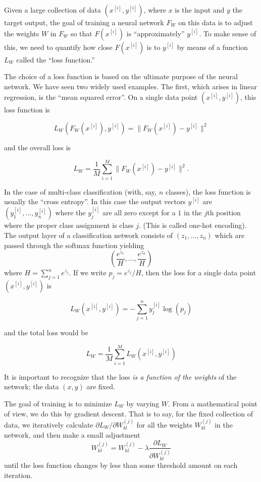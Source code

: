 \documentclass[
  11pt,
  letterpaper,
]{scrbook}
\theoremstyle{plain}
\theoremstyle{remark}
\begin{document}
Given a large collection of data \((x^{[i]},y^{[i]})\), where \(x\) is
the input and \(y\) the target output, the goal of training a neural
network \(F_{W}\) on this data is to adjust the weights \(W\) in
\(F_{W}\) so that \(F(x^{[i]})\) is ``approximately'' \(y^{[i]}\). To
make sense of this, we need to quantify how close \(F(x^{[i]})\) is to
\(y^{[i]}\) by means of a function \(L_{W}\) called the ``loss
function.''

The choice of a loss function is based on the ultimate purpose of the
neural network. We have seen two widely used examples. The first, which
arises in linear regression, is the ``mean squared error''. On a single
data point \((x^{[i]},y^{[i]})\), this loss function is

\[
L_{W}(F_{W}(x^{[i]}),y^{[i]}) =  \|F_{W}(x^{[i]})-y^{[i]}\|^2
\]

and the overall loss is

\[
L_{W}=\frac{1}{M}\sum_{i=1}^{M} \|F_{W}(x^{[i]})-y^{[i]}\|^2.
\]

In the case of multi-class classification (with, say, \(n\) classes),
the loss function is usually the ``cross entropy''. In this case the
output vectors \(y^{[i]}\) are \((y_{1}^{[i]},\ldots, y_{n}^{[i]})\)
where the \(y_j^{[i]}\) are all zero except for a \(1\) in the \(j\)th
position where the proper class assignment is class \(j\). (This is
called one-hot encoding). The output layer of a classification network
consists of \((z_{1},\ldots, z_{n})\) which are passed through the
softmax function yielding \[
(\frac{e^{z_1}}{H},\ldots, \frac{e^{z_{n}}}{H})
\] where \(H=\sum_{j=1}^{n} e^{z_{j}}.\) If we write
\(p_{j}=e^{z_{j}}/H\), then the loss for a single data point
\((x^{[i]},y^{[i]})\) is

\[
L_{W}(x^{[i]},y^{[i]}) = -\sum_{j=1}^{n} y^{[i]}_{j}\log(p_{j})
\]

and the total loss would be

\[
L_{W} = \frac{1}{M}\sum_{i=1}^{M} L_{W}(x^{[i]},y^{[i]})
\]

It is important to recognize that the loss \emph{is a function of the
weights} of the network; the data \((x,y)\) are fixed.

The goal of training is to minimize \(L_{W}\) by varying \(W\). From a
mathematical point of view, we do this by gradient descent. That is to
say, for the fixed collection of data, we iteratively calculate
\(\partial L_{W}/\partial W^{(j)}_{kl}\) for all the weights
\(W^{(j)}_{kl}\) in the network, and then make a small adjustment \[
W^{(j)}_{kl} = W^{(j)}_{kl} - \lambda \frac{\partial L_{W}}{\partial W^{(j)}_{kl}}
\] until the loss function changes by less than some threshold amount on
each iteration.
\end{document}
